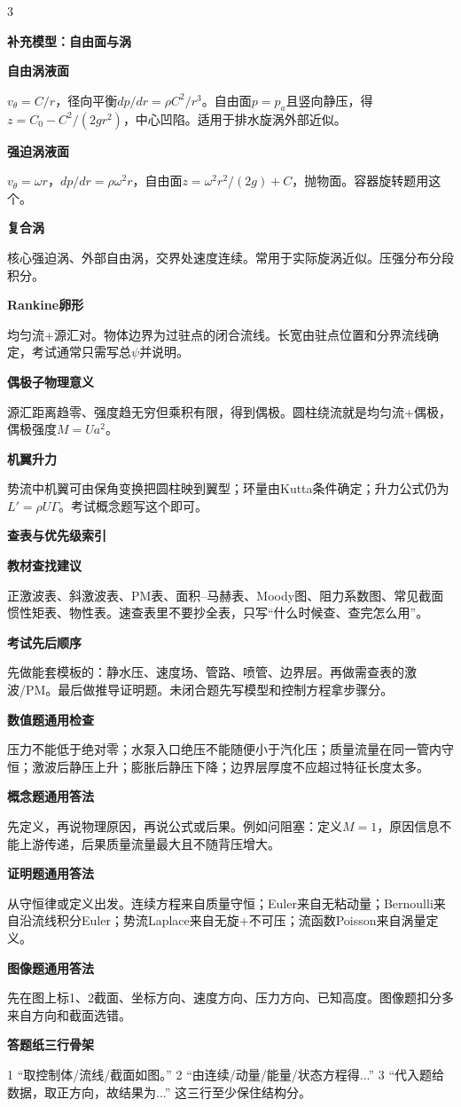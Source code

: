 \documentclass[a4paper]{article}
\newcommand{\qt}[1]{\vspace{0.25pt}\colorbox{Q}{\parbox{\dimexpr\linewidth-2\fboxsep}{\color{white}\bfseries #1}}\par}
\newcommand{\sect}[1]{\qt{#1}}
\begin{document}
\begin{multicols}{3}
{\sect{补充模型：自由面与涡}
\sect{自由涡液面}
$v_\theta=C/r$，径向平衡$dp/dr=\rho C^2/r^3$。自由面$p=p_a$且竖向静压，得$z=C_0-C^2/(2gr^2)$，中心凹陷。适用于排水旋涡外部近似。
\sect{强迫涡液面}
$v_\theta=\omega r$，$dp/dr=\rho\omega^2r$，自由面$z=\omega^2r^2/(2g)+C$，抛物面。容器旋转题用这个。
\sect{复合涡}
核心强迫涡、外部自由涡，交界处速度连续。常用于实际旋涡近似。压强分布分段积分。
\sect{Rankine卵形}
均匀流+源汇对。物体边界为过驻点的闭合流线。长宽由驻点位置和分界流线确定，考试通常只需写总$\psi$并说明。
\sect{偶极子物理意义}
源汇距离趋零、强度趋无穷但乘积有限，得到偶极。圆柱绕流就是均匀流+偶极，偶极强度$M=Ua^2$。
\sect{机翼升力}
势流中机翼可由保角变换把圆柱映到翼型；环量由Kutta条件确定；升力公式仍为$L'=\rho U\Gamma$。考试概念题写这个即可。

\sect{查表与优先级索引}
\sect{教材查找建议}
正激波表、斜激波表、PM表、面积--马赫表、Moody图、阻力系数图、常见截面惯性矩表、物性表。速查表里不要抄全表，只写“什么时候查、查完怎么用”。
\sect{考试先后顺序}
先做能套模板的：静水压、速度场、管路、喷管、边界层。再做需查表的激波/PM。最后做推导证明题。未闭合题先写模型和控制方程拿步骤分。
\sect{数值题通用检查}
压力不能低于绝对零；水泵入口绝压不能随便小于汽化压；质量流量在同一管内守恒；激波后静压上升；膨胀后静压下降；边界层厚度不应超过特征长度太多。
\sect{概念题通用答法}
先定义，再说物理原因，再说公式或后果。例如问阻塞：定义$M=1$，原因信息不能上游传递，后果质量流量最大且不随背压增大。
\sect{证明题通用答法}
从守恒律或定义出发。连续方程来自质量守恒；Euler来自无粘动量；Bernoulli来自沿流线积分Euler；势流Laplace来自无旋+不可压；流函数Poisson来自涡量定义。
\sect{图像题通用答法}
先在图上标1、2截面、坐标方向、速度方向、压力方向、已知高度。图像题扣分多来自方向和截面选错。
\sect{答题纸三行骨架}
1 “取控制体/流线/截面如图。” 2 “由连续/动量/能量/状态方程得...” 3 “代入题给数据，取正方向，故结果为...” 这三行至少保住结构分。

}
\end{multicols}
\end{document}
